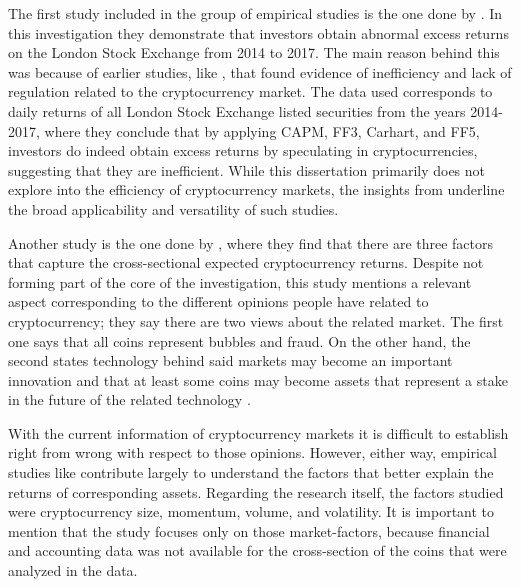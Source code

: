 The first study included in the group of empirical studies is the one done by \parencite{gregoriou2019cryptocurrencies}. In this investigation they demonstrate that investors obtain abnormal excess returns on the London Stock Exchange from 2014 to 2017. The main reason behind this was because of earlier studies, like \parencite{bariviera2017inefficiency}, that found evidence of inefficiency and lack of regulation related to the cryptocurrency market. The data used corresponds to daily returns of all London Stock Exchange listed securities from the years 2014-2017, where they conclude that by applying CAPM, FF3, Carhart, and FF5, investors do indeed obtain excess returns by speculating in cryptocurrencies, suggesting that they are inefficient. While this dissertation primarily does not explore into the efficiency of cryptocurrency markets, the insights from \parencite{gregoriou2019cryptocurrencies} underline the broad applicability and versatility of such studies.

Another study is the one done by \parencite{liu2022common}, where they find that there are three factors that capture the cross-sectional expected cryptocurrency returns. Despite not forming part of the core of the investigation, this study mentions a relevant aspect corresponding to the different opinions people have related to cryptocurrency; they say there are two views about the related market. The first one says that all coins represent bubbles and fraud. On the other hand, the second states technology behind said markets may become an important innovation and that at least some coins may become assets that represent a stake in the future of the related technology \parencite{liu2022common}. 

With the current information of cryptocurrency markets it is difficult to establish right from wrong with respect to those opinions. However, either way, empirical studies like \parencite{liu2022common} contribute largely to understand the factors that better explain the returns of corresponding assets. Regarding the research itself, the factors studied were cryptocurrency size, momentum, volume, and volatility. It is important to mention that the study focuses only on those market-factors, because financial and accounting data was not available for the cross-section of the coins that were analyzed in the data.

